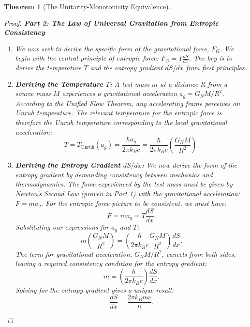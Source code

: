 \documentclass[11pt, letterpaper]{report}
\theoremstyle{plain} %
\newtheorem{theorem}{Theorem}[chapter]
\theoremstyle{definition} %
\theoremstyle{remark} %
\begin{document}
\begin{theorem}[The Unitarity-Monotonicity Equivalence]
\begin{proof}
\textbf{Part 2: The Law of Universal Gravitation from Entropic Consistency}
\begin{enumerate}
    \item We now seek to derive the specific form of the gravitational force, $F_G$. We begin with the central principle of entropic force: $F_G = T \frac{dS}{dx}$. The key is to derive the temperature $T$ and the entropy gradient $dS/dx$ from first principles.

    \item \textbf{Deriving the Temperature $T$:} A test mass $m$ at a distance $R$ from a source mass $M$ experiences a gravitational acceleration $a_g = G_N M/R^2$. According to the Unified Flow Theorem, any accelerating frame perceives an Unruh temperature. The relevant temperature for the entropic force is therefore the Unruh temperature corresponding to the local gravitational acceleration:
    \begin{equation}
        T = T_{\text{Unruh}}(a_g) = \frac{\hbar a_g}{2\pi k_B c} = \frac{\hbar}{2\pi k_B c} \left(\frac{G_N M}{R^2}\right).
        \label{eq:unruh_temp_gravity}
    \end{equation}

    \item \textbf{Deriving the Entropy Gradient $dS/dx$:} We now derive the form of the entropy gradient by demanding consistency between mechanics and thermodynamics. The force experienced by the test mass must be given by Newton's Second Law (proven in Part 1) with the gravitational acceleration: $F = m a_g$. For the entropic force picture to be consistent, we must have:
    $$ F = m a_g = T \frac{dS}{dx}. $$
    Substituting our expressions for $a_g$ and $T$:
    $$ m \left(\frac{G_N M}{R^2}\right) = \left( \frac{\hbar}{2\pi k_B c} \frac{G_N M}{R^2} \right) \frac{dS}{dx}. $$
    The term for gravitational acceleration, $G_N M/R^2$, cancels from both sides, leaving a required consistency condition for the entropy gradient:
    $$ m = \left( \frac{\hbar}{2\pi k_B c} \right) \frac{dS}{dx}. $$
    Solving for the entropy gradient gives a unique result:
    \begin{equation}
        \frac{dS}{dx} = \frac{2\pi k_B m c}{\hbar}.
        \label{eq:derived_entropy_gradient}
    \end{equation}


\end{enumerate}
\end{proof}
\end{theorem}
\end{document}
